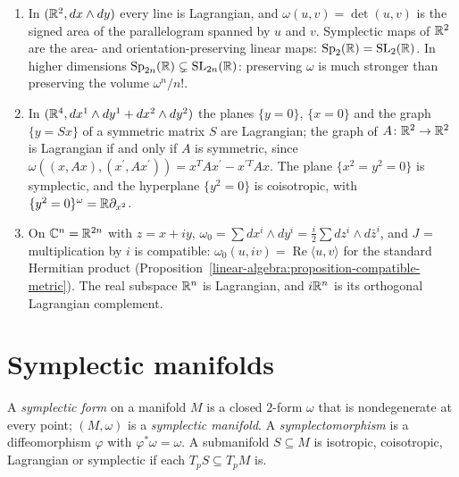 \begin{example}\label{symplectic-geometry:example-linear}
\begin{enumerate}
\item In $(\mathbb{R}^2, dx \wedge dy)$ every line is Lagrangian, and $\omega(u, v) = \det(u, v)$ is the signed area of the parallelogram spanned by $u$ and $v$. Symplectic maps of $\mathbb{R}^2$ are the area- and
orientation-preserving linear maps: $\mathrm{Sp}_2(\mathbb{R}) = \mathrm{SL}_2(\mathbb{R})$. In higher dimensions $\mathrm{Sp}_{2n}(\mathbb{R}) \subsetneq \mathrm{SL}_{2n}(\mathbb{R})$: preserving $\omega$ is much stronger than
preserving the volume $\omega^n/n!$.
\item In $(\mathbb{R}^4, dx^1 \wedge dy^1 + dx^2 \wedge dy^2)$ the planes $\{y = 0\}$, $\{x = 0\}$ and the graph $\{y = Sx\}$ of a symmetric matrix $S$ are Lagrangian; the graph of $A \colon \mathbb{R}^2 \to \mathbb{R}^2$ is
Lagrangian if and only if $A$ is symmetric, since $\omega((x, Ax), (x^{\prime}, Ax^{\prime})) = x^TAx^{\prime} - x^{\prime T}Ax$. The plane $\{x^2 = y^2 = 0\}$ is symplectic, and the hyperplane
$\{y^2 = 0\}$ is coisotropic, with $\{y^2 = 0\}^\omega = \mathbb{R}\partial_{x^2}$.
\item On $\mathbb{C}^n = \mathbb{R}^{2n}$ with $z = x + iy$, $\omega_0 = \sum dx^i \wedge dy^i = \frac i2\sum dz^i \wedge d\bar z^i$, and $J$ = multiplication by $i$ is compatible: $\omega_0(u, iv) = \operatorname{Re}\langle u, v\rangle$
for the standard Hermitian product (Proposition~\ref{linear-algebra:proposition-compatible-metric}). The real subspace $\mathbb{R}^n$ is Lagrangian, and $i\mathbb{R}^n$ is its orthogonal Lagrangian complement.
\end{enumerate}
\end{example}

\section{Symplectic manifolds}\label{symplectic-geometry:section-manifolds}

\begin{definition}\label{symplectic-geometry:definition-symplectic-manifold}
A \emph{symplectic form} on a manifold $M$ is a closed $2$-form $\omega$ that is nondegenerate at every point; $(M, \omega)$ is a \emph{symplectic manifold}. A \emph{symplectomorphism} is a
diffeomorphism $\varphi$ with $\varphi^*\omega = \omega$. A submanifold $S \subseteq M$ is isotropic, coisotropic, Lagrangian or symplectic if each $T_pS \subseteq T_pM$ is.
\end{definition}

